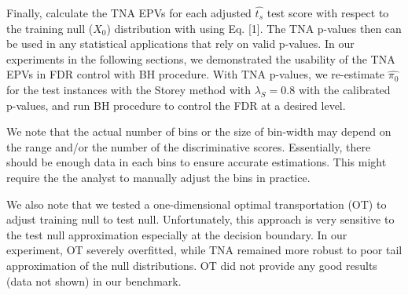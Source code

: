 \documentclass{article}
\newcommand{\edit}[1]{{\color{red}#1}}
\begin{document}
	Finally, calculate the TNA EPVs for each adjusted $\hat{t_s}$ test score with respect to the \edit{training null ($X_0$)} distribution with using Eq. [1]. \edit{The TNA p-values then can be used in any statistical applications that rely on valid p-values. In our experiments in the following sections, we demonstrated the usability of the TNA EPVs in FDR control with BH procedure. With TNA p-values, we re-estimate $\hat{\pi_0}$ for the test instances with the Storey method with $\lambda_S= 0.8$ with the calibrated p-values}, and run BH procedure to control the FDR at a desired level. 
	
	\edit{We note that the actual number of bins or the size of bin-width may depend on the range and/or the number of the discriminative scores. Essentially, there should be enough data in each bins to ensure accurate estimations. This might require the the analyst to manually adjust the bins in practice.}
	
	We also note that we tested a one-dimensional optimal transportation (OT) to adjust training null to test null. Unfortunately, this approach is very sensitive to the test null approximation especially at the decision boundary. In our experiment, OT severely overfitted, while TNA remained more robust to poor tail approximation of the null distributions. OT did not provide any good results (data not shown) in our benchmark. 
	
\end{document}
